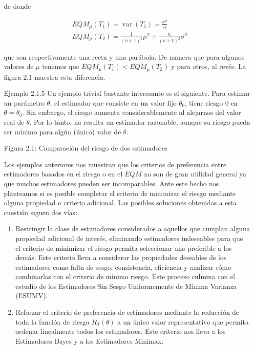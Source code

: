 \documentclass[
]{article}
\providecommand{\tightlist}{%
  \setlength{\itemsep}{0pt}\setlength{\parskip}{0pt}}
\begin{document}
de donde

\[
\begin{aligned}
& E Q M_{\mu}\left(T_{1}\right)=\operatorname{var}\left(T_{1}\right)=\frac{\sigma^{2}}{n} \\
& E Q M_{\mu}\left(T_{2}\right)=\frac{1}{(n+1)^{2}} \mu^{2}+\frac{n}{(n+1)^{2}} \sigma^{2}
\end{aligned}
\]

que son respectivamente una recta y una parábola. De manera que para algunos valores de \(\mu\) tenemos que \(E Q M_{\mu}\left(T_{1}\right)<E Q M_{\mu}\left(T_{2}\right)\) y para otros, al revés. La figura 2.1 muestra esta diferencia.

Ejemplo 2.1.5 Un ejemplo trivial bastante interesante es el siguiente. Para estimar un parámetro \(\theta\), el estimador que consiste en un valor fijo \(\theta_{0}\), tiene riesgo 0 en \(\theta=\theta_{0}\). Sin embargo, el riesgo aumenta considerablemente al alejarnos del valor real de \(\theta\). Por lo tanto, no resulta un estimador razonable, aunque su riesgo pueda ser mínimo para algún (único) valor de \(\theta\).

Figura 2.1: Comparación del riesgo de dos estimadores

Los ejemplos anteriores nos muestran que los criterios de preferencia entre estimadores basados en el riesgo o en el \(E Q M\) no son de gran utilidad general ya que muchos estimadores pueden ser incomparables. Ante este hecho nos planteamos si es posible completar el criterio de minimizar el riesgo mediante alguna propiedad o criterio adicional. Las posibles soluciones obtenidas a esta cuestión siguen dos vías:

\begin{enumerate}
\def\labelenumi{\arabic{enumi}.}
\tightlist
\item
  Restringir la clase de estimadores considerados a aquellos que cumplan alguna propiedad adicional de interés, eliminando estimadores indeseables para que el criterio de minimizar el riesgo permita seleccionar uno preferible a los demás. Este criterio lleva a considerar las propiedades deseables de los estimadores como falta de sesgo, consistencia, eficiencia y analizar cómo combinarlas con el criterio de mínimo riesgo. Este proceso culmina con el estudio de los Estimadores Sin Sesgo Uniformemente de Mínima Varianza (ESUMV).
\item
  Reforzar el criterio de preferencia de estimadores mediante la reducción de toda la función de riesgo \(R_{T}(\theta)\) a un único valor representativo que permita ordenar linealmente todos los estimadores. Este criterio nos lleva a los Estimadores Bayes y a los Estimadores Minimax.
\end{enumerate}
\end{document}
